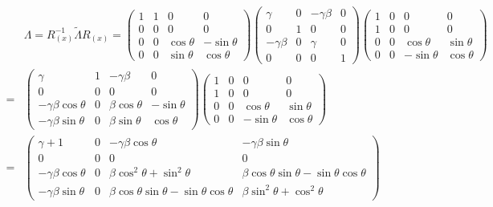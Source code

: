 \documentclass[10pt,a4paper]{article}
\begin{document}
\begin{enumerate}
\begin{equation} \label{boost arbitrário}
\begin{split}
&\Lambda = R_{(x)}^{-1}\tilde{\Lambda}R_{(x)} = \begin{pmatrix}
1 & 1 & 0 & 0 \\ 
0 & 0 & 0 & 0 \\ 
0 & 0 & \cos\theta & -\sin\theta \\ 
0 & 0 & \sin\theta & \cos\theta
\end{pmatrix} \begin{pmatrix}
\gamma & 0 & -\gamma \beta & 0 \\ 
0 & 1 & 0 & 0 \\ 
-\gamma \beta & 0 & \gamma & 0 \\ 
0 & 0 & 0 & 1
\end{pmatrix} \begin{pmatrix}
1 & 0 & 0 & 0 \\ 
1 & 0 & 0 & 0 \\ 
0 & 0 & \cos\theta & \sin\theta \\ 
0 & 0 & -\sin\theta & \cos\theta
\end{pmatrix} 
\\  =& \begin{pmatrix}
\gamma & 1 & -\gamma \beta & 0 \\ 
0 & 0 & 0 & 0 \\ 
-\gamma \beta \cos\theta & 0 & \beta \cos\theta & -\sin\theta \\ 
-\gamma \beta \sin\theta & 0 & \beta \sin\theta & \cos\theta
\end{pmatrix} \begin{pmatrix}
1 & 0 & 0 & 0 \\ 
1 & 0 & 0 & 0 \\ 
0 & 0 & \cos\theta & \sin\theta \\ 
0 & 0 & -\sin\theta & \cos\theta
\end{pmatrix} \\ =  &\begin{pmatrix}
\gamma +1 & 0 & -\gamma \beta \cos\theta & -\gamma \beta \sin\theta \\ 
0 & 0 & 0 & 0 \\ 
-\gamma \beta \cos\theta & 0 & \beta \cos^2\theta+\sin^2\theta & \beta \cos\theta \sin\theta - \sin\theta \cos\theta \\ 
-\gamma \beta \sin\theta & 0 & \beta \cos\theta \sin\theta - \sin\theta \cos\theta & \beta \sin^2\theta + \cos^2\theta
\end{pmatrix} 
\end{split} 
\end{equation}


\end{enumerate}
\end{document}
